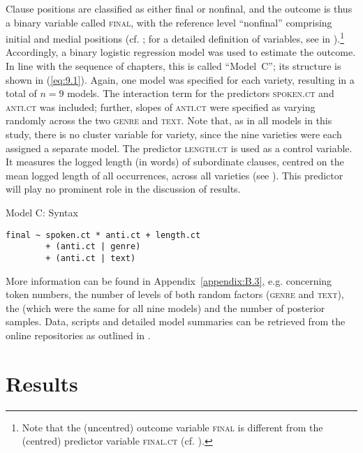 Clause positions are classified as either final or nonfinal, and the outcome is thus a binary variable called \textsc{final}, with the reference level “nonfinal” comprising initial and medial positions (cf. ; for a detailed definition of variables, see  in ).\footnote{Note that the (uncentred) outcome variable \textsc{final} is different from the (centred) predictor variable \textsc{final.ct} (cf. ).} Accordingly, a binary logistic regression model was used to estimate the outcome. In line with the sequence of chapters, this is called “Model~C”; its structure is shown in (\ref{eq:9.1}). Again, one model was specified for each variety, resulting in a total of $n=9$ models. The interaction term for the predictors \textsc{spoken.ct} and \textsc{anti.ct} was included; further, slopes of \textsc{anti.ct} were specified as varying randomly across the two  \textsc{genre} and \textsc{text}. Note that, as in all models in this study, there is no cluster variable for variety, since the nine varieties were each assigned a separate model. The predictor \textsc{length.ct} is used as a control variable. It measures the logged length (in words) of subordinate clauses, centred on the mean logged length of all occurrences, across all varieties (see ). This predictor will play no prominent role in the discussion of results.

\ea
\label{bkm:Ref41473527}\label{eq:9.1}Model C: Syntax
\begin{lstlisting}
final ~ spoken.ct * anti.ct + length.ct
        + (anti.ct | genre)
        + (anti.ct | text)
\end{lstlisting}
\z


More information can be found in Appendix~\ref{appendix:B.3}, e.g. concerning token numbers, the number of levels of both random factors (\textsc{genre} and \textsc{text}), the  (which were the same for all nine models) and the number of posterior samples. Data, scripts and detailed model summaries can be retrieved from the online repositories as outlined in .

\section{\label{bkm:Ref51055367}Results}\label{sec:9.2}

